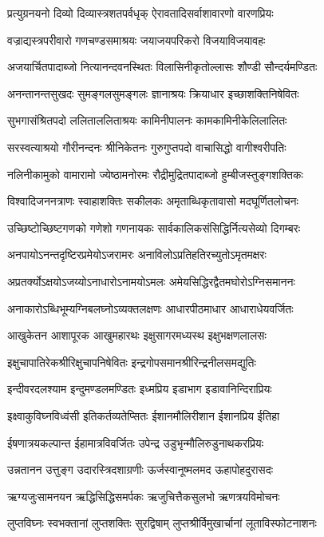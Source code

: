 \twolineshloka
{प्रत्युग्रनयनो दिव्यो दिव्यास्त्रशतपर्वधृक्}
{ऐरावतादिसर्वाशावारणो वारणप्रियः}%

\twolineshloka
{वज्राद्यस्त्रपरीवारो गणचण्डसमाश्रयः}
{जयाजयपरिकरो विजयाविजयावहः}%

\twolineshloka
{अजयार्चितपादाब्जो नित्यानन्दवनस्थितः}
{विलासिनीकृतोल्लासः शौण्डी सौन्दर्यमण्डितः}%

\twolineshloka
{अनन्तानन्तसुखदः सुमङ्गलसुमङ्गलः}
{ज्ञानाश्रयः क्रियाधार इच्छाशक्तिनिषेवितः}%

\twolineshloka
{सुभगासंश्रितपदो ललिताललिताश्रयः}
{कामिनीपालनः कामकामिनीकेलिलालितः}%

\twolineshloka
{सरस्वत्याश्रयो गौरीनन्दनः श्रीनिकेतनः}
{गुरुगुप्तपदो वाचासिद्धो वागीश्वरीपतिः}%

\twolineshloka
{नलिनीकामुको वामारामो ज्येष्ठामनोरमः}
{रौद्रीमुद्रितपादाब्जो हुम्बीजस्तुङ्गशक्तिकः}%

\twolineshloka
{विश्वादिजननत्राणः स्वाहाशक्तिः सकीलकः}
{अमृताब्धिकृतावासो मदघूर्णितलोचनः}%

\twolineshloka
{उच्छिष्टोच्छिष्टगणको गणेशो गणनायकः}
{सार्वकालिकसंसिद्धिर्नित्यसेव्यो दिगम्बरः}%

\twolineshloka
{अनपायोऽनन्तदृष्टिरप्रमेयोऽजरामरः}
{अनाविलोऽप्रतिहतिरच्युतोऽमृतमक्षरः}%

\twolineshloka
{अप्रतर्क्योऽक्षयोऽजय्योऽनाधारोऽनामयोऽमलः}
{अमेयसिद्धिरद्वैतमघोरोऽग्निसमाननः}%

\twolineshloka
{अनाकारोऽब्धिभूम्यग्निबलघ्नोऽव्यक्तलक्षणः}
{आधारपीठमाधार आधाराधेयवर्जितः}%

\twolineshloka
{आखुकेतन आशापूरक आखुमहारथः}
{इक्षुसागरमध्यस्थ इक्षुभक्षणलालसः}%

\twolineshloka
{इक्षुचापातिरेकश्रीरिक्षुचापनिषेवितः}
{इन्द्रगोपसमानश्रीरिन्द्रनीलसमद्युतिः}%

\twolineshloka
{इन्दीवरदलश्याम इन्दुमण्डलमण्डितः}
{इध्मप्रिय इडाभाग इडावानिन्दिराप्रियः}%

\twolineshloka
{इक्ष्वाकुविघ्नविध्वंसी इतिकर्तव्यतेप्सितः}
{ईशानमौलिरीशान ईशानप्रिय ईतिहा}%

\twolineshloka
{ईषणात्रयकल्पान्त ईहामात्रविवर्जितः}
{उपेन्द्र उडुभृन्मौलिरुडुनाथकरप्रियः}%

\twolineshloka
{उन्नतानन उत्तुङ्ग उदारस्त्रिदशाग्रणीः}
{ऊर्जस्वानूष्मलमद ऊहापोहदुरासदः}%

\twolineshloka
{ऋग्यजुःसामनयन ऋद्धिसिद्धिसमर्पकः}
{ऋजुचित्तैकसुलभो ऋणत्रयविमोचनः}%

\twolineshloka
{लुप्तविघ्नः स्वभक्तानां लुप्तशक्तिः सुरद्विषाम्}
{लुप्तश्रीर्विमुखार्चानां लूताविस्फोटनाशनः}%

